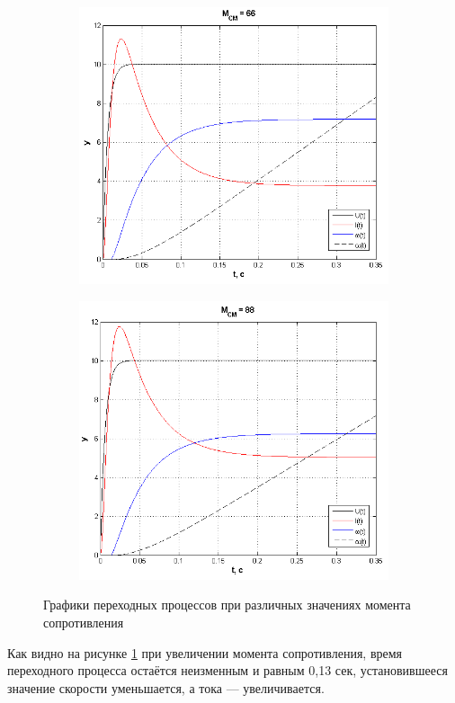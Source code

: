 \documentclass[fleqn, a4paper, 11pt, russian]{article}
\begin{document}
	\begin{figure}[ht!]\ContinuedFloat
		\centering
		\begin{subfigure}[b]{0.49\textwidth}
			\includegraphics[width = \textwidth]{M66}
		\end{subfigure}
		\hfill
		\begin{subfigure}[b]{0.49\textwidth}
			\includegraphics[width = \textwidth]{M88}
		\end{subfigure}
		\caption{Графики переходных процессов при различных значениях момента сопротивления}
		\label{MVar}
	\end{figure}
	Как видно на рисунке \ref{MVar} при увеличении момента сопротивления, время переходного процесса остаётся неизменным и равным 0,13 сек, установившееся значение скорости уменьшается, а тока --- увеличивается.
	\clearpage
\end{document}
